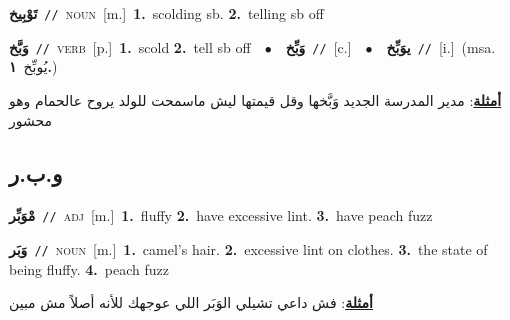 \documentclass[10pt,a4paper,twoside]{article} %
\begin{document}
\begin{multicols}{2}
{\setlength\topsep{0pt}\textbf{\foreignlanguage{arabic}{تَوْبِيخ}}\ {\color{gray}\texttt{//}\color{black}}\ \textsc{noun}\ [m.]\ \textbf{1.}~scolding sb.  \textbf{2.}~telling sb off\ } \vspace{2mm}

{\setlength\topsep{0pt}\textbf{\foreignlanguage{arabic}{وَبَّخ}}\ {\color{gray}\texttt{//}\color{black}}\ \textsc{verb}\ [p.]\ \textbf{1.}~scold  \textbf{2.}~tell sb off\ \ $\bullet$\ \ \setlength\topsep{0pt}\textbf{\foreignlanguage{arabic}{وَبِّخ}}\ {\color{gray}\texttt{//}\color{black}}\ [c.]\ \ $\bullet$\ \ \setlength\topsep{0pt}\textbf{\foreignlanguage{arabic}{يوَبِّخ}}\ {\color{gray}\texttt{//}\color{black}}\ [i.]\ \color{gray}(msa. \foreignlanguage{arabic}{يُوبِّخ}~\foreignlanguage{arabic}{\textbf{١.}})\color{black}\  \begin{flushright}\color{gray}\foreignlanguage{arabic}{\textbf{\underline{\foreignlanguage{arabic}{أمثلة}}}: مدير المدرسة الجديد وَبَّخها وقل قيمتها ليش ماسمحت للولد يروح عالحمام وهو محشور}\end{flushright}\color{black}} \vspace{2mm}

\vspace{-3mm}
\subsection*{\color{blue}\foreignlanguage{arabic}{و.ب.ر}\color{blue}{}} 

{\setlength\topsep{0pt}\textbf{\foreignlanguage{arabic}{مْوَبِّر}}\ {\color{gray}\texttt{//}\color{black}}\ \textsc{adj}\ [m.]\ \textbf{1.}~fluffy  \textbf{2.}~have excessive lint.  \textbf{3.}~have peach fuzz\ } \vspace{2mm}

{\setlength\topsep{0pt}\textbf{\foreignlanguage{arabic}{وَبَر}}\ {\color{gray}\texttt{//}\color{black}}\ \textsc{noun}\ [m.]\ \textbf{1.}~camel's hair.  \textbf{2.}~excessive lint on clothes.  \textbf{3.}~the state of being fluffy.  \textbf{4.}~peach fuzz\  \begin{flushright}\color{gray}\foreignlanguage{arabic}{\textbf{\underline{\foreignlanguage{arabic}{أمثلة}}}: فش داعي تشيلي الوَبَر اللي عوجهك للأنه أصلاً مش مبين}\end{flushright}\color{black}} \vspace{2mm}


\end{multicols}
\end{document}
